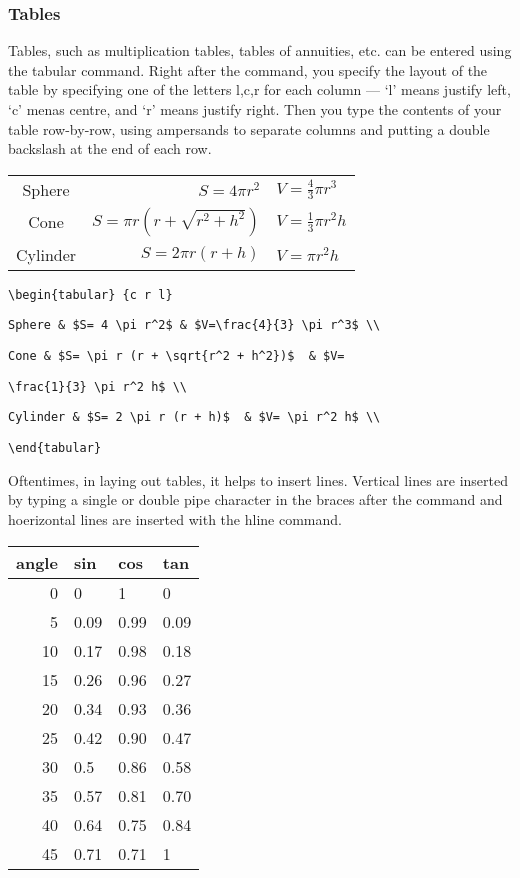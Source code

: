 \subsubsection{Tables}

Tables, such as multiplication tables, tables of annuities, etc. can be entered using the tabular command.  Right after the command, you specify the layout of the table by specifying one of the letters l,c,r for each column --- `l' means justify left, `c' menas centre, and `r' means justify right.  Then you type the contents of your table row-by-row, using ampersands to separate columns and putting a double backslash at the end of each row.

\medskip

\begin{tabular} {c r l}
Sphere & $S= 4 \pi r^2$ & $V=\frac{4}{3} \pi r^3$ \\
Cone & $S= \pi r (r + \sqrt{r^2 + h^2})$  & $V= \frac{1}{3} \pi r^2 h$ \\
Cylinder & $S= 2 \pi r (r + h)$  & $V= \pi r^2 h$ \\
\end{tabular}

\medskip

\verb"\begin{tabular} {c r l}"

\verb"Sphere & $S= 4 \pi r^2$ & $V=\frac{4}{3} \pi r^3$ \\"

\verb"Cone & $S= \pi r (r + \sqrt{r^2 + h^2})$  & $V="

\verb"\frac{1}{3} \pi r^2 h$ \\"

\verb"Cylinder & $S= 2 \pi r (r + h)$  & $V= \pi r^2 h$ \\"

\verb"\end{tabular}"

\bigskip

Oftentimes, in laying out tables, it helps to insert lines.  Vertical lines are inserted by typing a single or double pipe character in the braces after the command and hoerizontal lines are inserted with the hline command. 

\medskip

\begin{tabular}{r || l | l | l}
\textbf{angle} & \textbf{sin} & \textbf{cos} & \textbf{tan} \\
\hline
0 & 0 & 1 & 0 \\
5 & 0.09 & 0.99 & 0.09 \\
10 & 0.17 & 0.98 & 0.18 \\
15 & 0.26 & 0.96 & 0.27 \\
20 & 0.34 & 0.93 & 0.36 \\
25 & 0.42 & 0.90 & 0.47 \\
30 & 0.5 & 0.86 & 0.58 \\
35 & 0.57 & 0.81 & 0.70 \\
40 & 0.64 & 0.75 & 0.84 \\
45 & 0.71 & 0.71 & 1 \\
\end{tabular}

